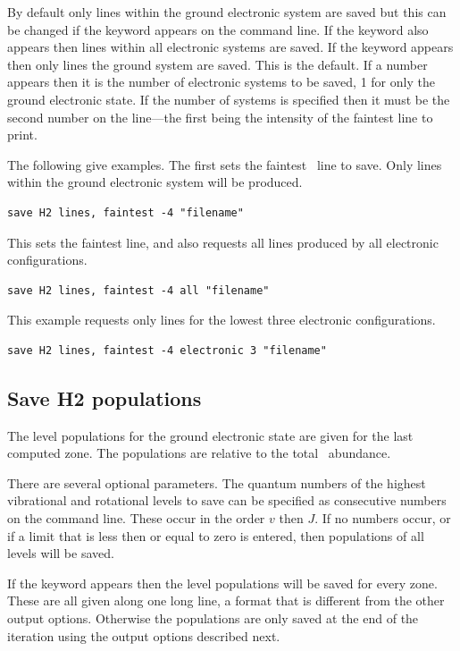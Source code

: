 By default only lines within the ground electronic system are saved
but this can be changed if the keyword 
appears on the command line.
If the keyword  also appears then lines
within all electronic systems are saved.
If the keyword  appears then only lines the
ground system are saved.  This is the default.  If a number appears then
it is the number of electronic systems to be saved, 1 for only the ground
electronic state.  If the number of systems is specified then it must be
the second number on the line---the first being
the intensity of the faintest line to print.

The following give examples.  The first sets the faintest \htwo\ line to
save.  Only lines within the ground electronic system will be produced.
\begin{verbatim}
save H2 lines, faintest -4 "filename"
\end{verbatim}
This sets the faintest line, and also requests all lines produced by all
electronic configurations.
\begin{verbatim}
save H2 lines, faintest -4 all "filename"
\end{verbatim}
This example requests only lines for the lowest three electronic
configurations.
\begin{verbatim}
save H2 lines, faintest -4 electronic 3 "filename"
\end{verbatim}

\subsection{Save H2 populations}

The level populations for the ground electronic state are given for the
last computed zone.  The populations are relative to the total \htwo\ abundance.

There are several optional parameters.
The quantum numbers of the highest
vibrational and rotational levels to save can be specified as consecutive
numbers on the command line.
These occur in the order $v$ then $J$.
If no
numbers occur, or if a limit that is less then or equal to zero is entered,
then populations of all levels will be saved.

If the keyword  appears then the level populations 
will be saved for every zone.   These are all given along one long line,
a format that is different from the other output options.  Otherwise the
populations are only saved at the end of the iteration using the output
options described next.

